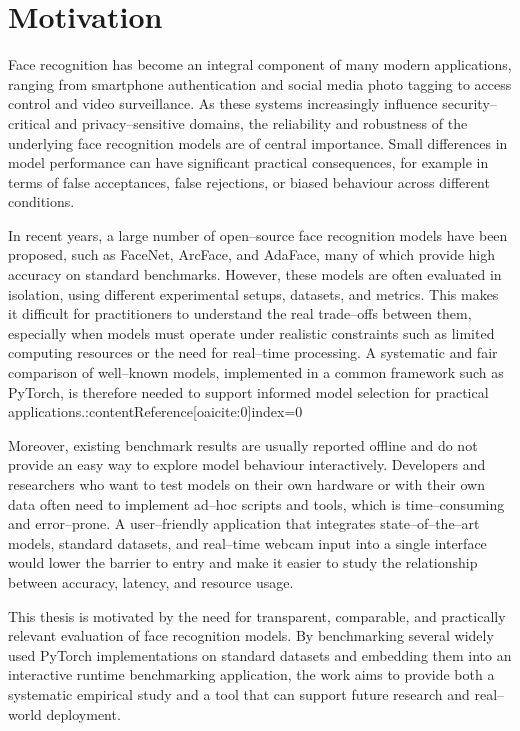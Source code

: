 \section{Motivation}

Face recognition has become an integral component of many modern applications, ranging from smartphone authentication and social media photo tagging to access control and video surveillance. As these systems increasingly influence security–critical and privacy–sensitive domains, the reliability and robustness of the underlying face recognition models are of central importance. Small differences in model performance can have significant practical consequences, for example in terms of false acceptances, false rejections, or biased behaviour across different conditions.

In recent years, a large number of open–source face recognition models have been proposed, such as FaceNet, ArcFace, and AdaFace, many of which provide high accuracy on standard benchmarks. However, these models are often evaluated in isolation, using different experimental setups, datasets, and metrics. This makes it difficult for practitioners to understand the real trade–offs between them, especially when models must operate under realistic constraints such as limited computing resources or the need for real–time processing. A systematic and fair comparison of well–known models, implemented in a common framework such as PyTorch, is therefore needed to support informed model selection for practical applications.:contentReference[oaicite:0]{index=0}

Moreover, existing benchmark results are usually reported offline and do not provide an easy way to explore model behaviour interactively. Developers and researchers who want to test models on their own hardware or with their own data often need to implement ad–hoc scripts and tools, which is time–consuming and error–prone. A user–friendly application that integrates state–of–the–art models, standard datasets, and real–time webcam input into a single interface would lower the barrier to entry and make it easier to study the relationship between accuracy, latency, and resource usage.

This thesis is motivated by the need for transparent, comparable, and practically relevant evaluation of face recognition models. By benchmarking several widely used PyTorch implementations on standard datasets and embedding them into an interactive runtime benchmarking application, the work aims to provide both a systematic empirical study and a tool that can support future research and real–world deployment.



